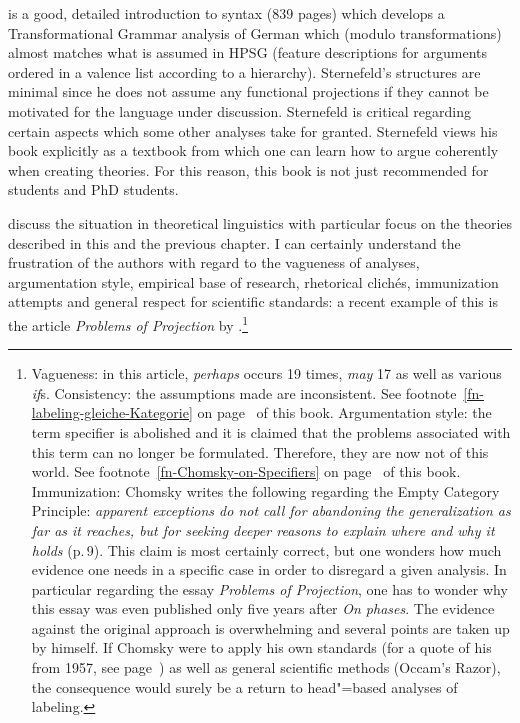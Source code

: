 { is a good, detailed introduction to syntax (839 pages) which develops a Transformational Grammar analysis of German which
(modulo transformations) almost matches what is assumed in HPSG (feature descriptions for arguments ordered in a valence list according to a 
hierarchy). Sternefeld's structures are minimal since he does not assume any functional projections if they cannot be motivated for the language
under discussion. Sternefeld is critical regarding certain aspects which some other analyses take for granted. Sternefeld views his book explicitly
as a textbook from which one can learn how to argue coherently when creating theories. For this reason, this book is not just 
recommended for students and PhD students.

\citet{SR2012a} discuss the situation in theoretical linguistics with particular focus on the
theories described in this and the previous chapter. I can certainly understand the frustration of
the authors with regard to the vagueness of analyses, argumentation style, empirical base of
research, rhetorical clich\'{e}s, immunization attempts and general respect for scientific
standards: a recent example of this is the article \emph{Problems of Projection} by \citet{Chomsky2013a}.\footnote{%
  Vagueness: in this article, \emph{perhaps} occurs 19 times, \emph{may} 17 as well as various \emph{if}s. Consistency: the assumptions made
  are inconsistent. See footnote~\ref{fn-labeling-gleiche-Kategorie} on
  page~\pageref{fn-labeling-gleiche-Kategorie} of this book. Argumentation style: the
  term specifier is abolished and it is claimed that the problems associated with this term can no longer be formulated. Therefore, they are now
  not of this world. See footnote~\ref{fn-Chomsky-on-Specifiers} on
  page~\pageref{fn-Chomsky-on-Specifiers} of this book. Immunization: Chomsky writes the following regarding the Empty Category Principle:
  \emph{apparent exceptions do not call for abandoning the generalization as far as it reaches, but for seeking
  deeper reasons to explain where and why it holds} (p.\,9). This claim is most certainly correct, but one wonders how much evidence one needs
  in a specific case in order to disregard a given analysis. In particular regarding the essay \emph{Problems of Projection}, one has to wonder
  why this essay was even published only five years after \emph{On phases}. The evidence against the original approach is overwhelming and several
  points are taken up by \citet{Chomsky2013a} himself. If Chomsky were to apply his own standards (for a quote of his from 1957, see
  page~\pageref{quote-Chomsky-Formalisierung}) as well as general scientific methods (Occam's Razor), the consequence would surely be a return
  to head"=based analyses of labeling.

}}
